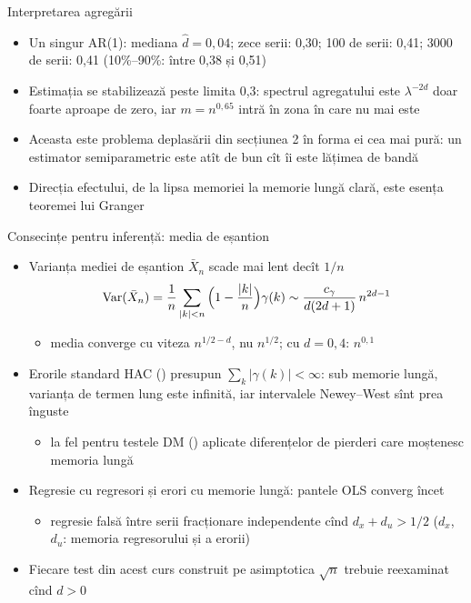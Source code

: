 \begin{frame}{Interpretarea agregării}
\itemsize{\small}
\begin{itemize}
    \item Un singur AR(1): mediana $\hat d = 0{,}04$; zece serii: 0{,}30; 100 de serii: 0{,}41; 3000 de serii: 0{,}41 (10\%--90\%: între 0{,}38 și 0{,}51)
    \item Estimația se stabilizează peste limita 0{,}3: spectrul agregatului este $\lambda^{-2d}$ doar foarte aproape de zero, iar $m = n^{0{,}65}$ intră în zona în care nu mai este
    \item Aceasta este problema deplasării din secțiunea 2 în forma ei cea mai pură: un estimator semiparametric este atît de bun cît îi este lățimea de bandă
    \item Direcția efectului, de la lipsa memoriei la memorie lungă clară, este esența teoremei lui Granger
\end{itemize}
\end{frame}

\begin{frame}{Consecințe pentru inferență: media de eșantion}
\itemsize{\small}
\begin{itemize}
    \item Varianța mediei de eșantion $\bar X_n$ scade mai lent decît $1/n$
    \[ \text{Var}(\bar X_n) = \frac1n\sum_{|k|<n}\Big(1 - \frac{|k|}{n}\Big)\gamma(k) \sim \frac{c_\gamma}{d(2d + 1)}\,n^{2d-1} \]
    \begin{itemize}
        \item media converge cu viteza $n^{1/2-d}$, nu $n^{1/2}$; cu $d = 0{,}4$: $n^{0{,}1}$
    \end{itemize}
    \item Erorile standard HAC () presupun $\sum_k|\gamma(k)| < \infty$: sub memorie lungă, varianța de termen lung este infinită, iar intervalele Newey--West sînt prea înguste
    \begin{itemize}
        \item la fel pentru testele DM () aplicate diferențelor de pierderi care moștenesc memoria lungă
    \end{itemize}
    \item Regresie cu regresori și erori cu memorie lungă: pantele OLS converg încet
    \begin{itemize}
        \item regresie falsă între serii fracționare independente cînd $d_x + d_u > 1/2$ ($d_x$, $d_u$: memoria regresorului și a erorii)
    \end{itemize}
    \item Fiecare test din acest curs construit pe asimptotica $\sqrt n$ trebuie reexaminat cînd $d > 0$
\end{itemize}
\end{frame}


